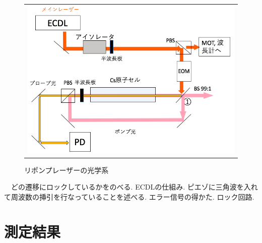 \documentclass[uplatex, dvipdfmx, a4paper, report, papersize, 11pt]{jsbook}
\begin{document}
\begin{figure}[htpb]
\begin{tabular}{c}
      \begin{minipage}{1\hsize}
        \centering
          \includegraphics[keepaspectratio,  scale=0.35,  angle=0]
                          {figures/saturated-absorption/repump_diagram.png}
                          \caption{リポンプレーザーの光学系}
                          \label{repump_diagram}
      \end{minipage}
    \end{tabular}
\end{figure}
　どの遷移にロックしているかをのべる. ECDLの仕組み. ピエゾに三角波を入れて周波数の挿引を行なっていることを述べる. エラー信号の得かた. ロック回路.
\section{測定結果}
\end{document}
